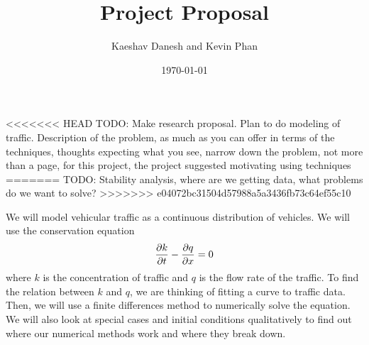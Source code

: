 \documentclass[12pt]{article}
\title{Project Proposal}
\author{Kaeshav Danesh and Kevin Phan}
\date{\today}
\begin{document}
	
	\maketitle
<<<<<<< HEAD
    TODO: Make research proposal. Plan to do modeling of traffic. Description of the problem, as much as you can offer in terms of the techniques, thoughts expecting what you see, narrow down the problem, not more than a page, for this project, the project suggested motivating using techniques 
=======
    TODO: Stability analysis, where are we getting data, what problems do we want to solve?
>>>>>>> e04072bc31504d57988a5a3436fb73c64ef55c10

    We will model vehicular traffic as a continuous distribution of vehicles. We will use the conservation equation 
    \begin{equation}
        \pdv{k}{t} - \pdv{q}{x} = 0
    \end{equation}
    where $k$ is the concentration of traffic and $q$ is the flow rate of the traffic. To find the relation between $k$ and $q$, we are thinking of fitting a curve to traffic data. Then, we will use a finite differences method to numerically solve the equation. We will also look at special cases and initial conditions qualitatively to find out where our numerical methods work and where they break down. 
\end{document}
